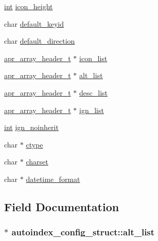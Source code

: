 \begin{DoxyCompactItemize}
\item 
\hyperlink{pcre_8txt_a42dfa4ff673c82d8efe7144098fbc198}{int} \hyperlink{structautoindex__config__struct_a5fcc2f608edc648d92d44197f4845916}{icon\+\_\+height}
\item 
char \hyperlink{structautoindex__config__struct_a0cb439716a093c6065380d51aca536c9}{default\+\_\+keyid}
\item 
char \hyperlink{structautoindex__config__struct_ac80367ec7290bd7998f0dc0e52caeda2}{default\+\_\+direction}
\item 
\hyperlink{structapr__array__header__t}{apr\+\_\+array\+\_\+header\+\_\+t} $\ast$ \hyperlink{structautoindex__config__struct_ab119336200caab071f91e7be04e8bdf9}{icon\+\_\+list}
\item 
\hyperlink{structapr__array__header__t}{apr\+\_\+array\+\_\+header\+\_\+t} $\ast$ \hyperlink{structautoindex__config__struct_a19c295e52b2ce0813e2a66181a3ff087}{alt\+\_\+list}
\item 
\hyperlink{structapr__array__header__t}{apr\+\_\+array\+\_\+header\+\_\+t} $\ast$ \hyperlink{structautoindex__config__struct_a3d35aa144641fabaab5f1820edb615e3}{desc\+\_\+list}
\item 
\hyperlink{structapr__array__header__t}{apr\+\_\+array\+\_\+header\+\_\+t} $\ast$ \hyperlink{structautoindex__config__struct_a38d037107163f6ad3a36428b8362b727}{ign\+\_\+list}
\item 
\hyperlink{pcre_8txt_a42dfa4ff673c82d8efe7144098fbc198}{int} \hyperlink{structautoindex__config__struct_a8e60a4b934ef60e908b801045791c33e}{ign\+\_\+noinherit}
\item 
char $\ast$ \hyperlink{structautoindex__config__struct_a0d76c49b046d4497371771feab336a67}{ctype}
\item 
char $\ast$ \hyperlink{structautoindex__config__struct_a527e731d8aa102de2c04ccad934f7132}{charset}
\item 
char $\ast$ \hyperlink{structautoindex__config__struct_abd577d4ae440a4b6341ba311c58daf97}{datetime\+\_\+format}
\end{DoxyCompactItemize}


\subsection{Field Documentation}
\subsubsection[{\texorpdfstring{alt\+\_\+list}{alt_list}}]{$\ast$ autoindex\+\_\+config\+\_\+struct\+::alt\+\_\+list}\hypertarget{structautoindex__config__struct_a19c295e52b2ce0813e2a66181a3ff087}{}\label{structautoindex__config__struct_a19c295e52b2ce0813e2a66181a3ff087}
